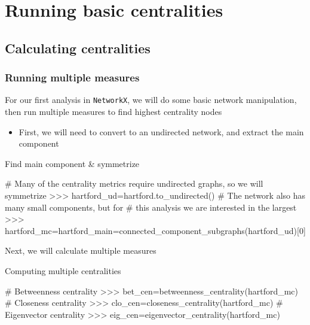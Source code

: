 \documentclass[xcolor=dvipsnames, 9pt]{beamer}
\newenvironment{code}{\begin{semiverbatim} \begin{footnotesize}}
{\end{footnotesize}\end{semiverbatim}}
\begin{document}


\section{Running basic centralities} %
\label{sec:running_basic_centralities}

\subsection{Calculating centralities} %
\label{sub:calculating_centralities}

\begin{frame}[fragile]
    \frametitle{Running multiple measures}
    For our first analysis in \texttt{NetworkX}, we will do some basic network manipulation, then run multiple measures to find highest centrality nodes
    \begin{itemize}
        \item First, we will need to convert to an undirected network, and extract the main component
    \end{itemize}
    \begin{block}{Find main component \& symmetrize}
        \begin{code}
# Many of the centrality metrics require undirected graphs, so we will symmetrize
>>> \alert<2>{hartford_ud=hartford.to_undirected()}
# The network also has many small components, but for
# this analysis we are interested in the largest
>>> \alert<3>{hartford_mc=hartford_main=connected_component_subgraphs(hartford_ud)[0]}
        \end{code}
    \end{block}
    Next, we will calculate multiple measures
    \begin{block}{Computing multiple centralities}
        \begin{code}
# Betweenness centrality
>>> \alert<4>{bet_cen=betweenness_centrality(hartford_mc)}
# Closeness centrality
>>> \alert<4>{clo_cen=closeness_centrality(hartford_mc)}
# Eigenvector centrality
>>> \alert<4>{eig_cen=eigenvector_centrality(hartford_mc)}
        \end{code}
    \end{block}
\end{frame}
\end{document}
